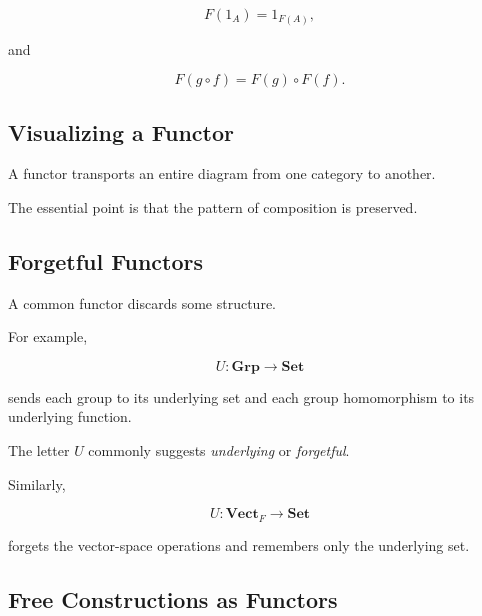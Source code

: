 \[ F(1_A)=1_{F(A)}, \]

and

\[ F(g\circ f)=F(g)\circ F(f). \]

\subsection{Visualizing a Functor}
\label{subsec:functor-visual}

A functor transports an entire diagram from one category to another.

\begin{center}
\end{center}

The essential point is that the pattern of composition is preserved.

\subsection{Forgetful Functors}
\label{subsec:forgetful-functors}

A common functor discards some structure.

For example,

\[ U:\mathbf{Grp}\to\mathbf{Set} \]

sends each group to its underlying set and each group homomorphism to its
underlying function.

The letter \(U\) commonly suggests \emph{underlying} or \emph{forgetful}.

Similarly,

\[ U:\mathbf{Vect}_F\to\mathbf{Set} \]

forgets the vector-space operations and remembers only the underlying set.

\subsection{Free Constructions as Functors}
\label{subsec:free-functors}

